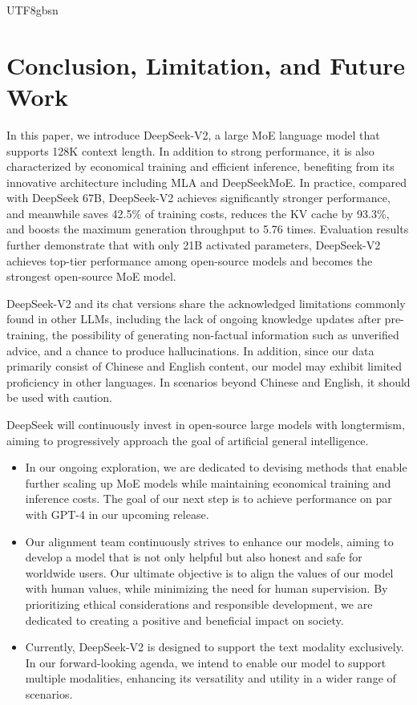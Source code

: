 \documentclass[11pt, a4paper, logo, copyright, nonumbering]{deepseek}
\newcommand{\dsvi}{DeepSeek 67B}
\newcommand{\dsvii}{DeepSeek-V2}
\newcommand{\dsattn}{MLA}
\newcommand{\dsmoe}{DeepSeekMoE}
\begin{document}
\begin{CJK*}{UTF8}{gbsn}
\section{Conclusion, Limitation, and Future Work}
\label{sec:conclusion}

In this paper, we introduce \dsvii{}, a large MoE language model that supports 128K context length. 
In addition to strong performance, it is also characterized by economical training and efficient inference, benefiting from its innovative architecture including \dsattn{} and \dsmoe{}. 
In practice, compared with \dsvi{}, \dsvii{} achieves significantly stronger
performance, and meanwhile saves 42.5\% of training costs, reduces the KV cache by 93.3\%, and boosts the maximum generation throughput to 5.76 times. 
Evaluation results further demonstrate that with only 21B activated parameters, \dsvii{} achieves top-tier performance among open-source models and becomes the strongest open-source MoE model. 

\dsvii{} and its chat versions share the acknowledged limitations commonly found in other LLMs, including the lack of ongoing knowledge updates after pre-training, the possibility of generating non-factual information such as unverified advice, and a chance to produce hallucinations. 
In addition, since our data primarily consist of Chinese and English content, our model may exhibit limited proficiency in other languages. 
In scenarios beyond Chinese and English, it should be used with caution.

DeepSeek will continuously invest in open-source large models with longtermism, aiming to progressively approach the goal of artificial general intelligence.
\begin{itemize}
    \item 
    In our ongoing exploration, we are dedicated to devising methods that enable further scaling up MoE models while maintaining economical training and inference costs. 
    The goal of our next step is to achieve performance on par with GPT-4 in our upcoming release.
    \item 
    Our alignment team continuously strives to enhance our models, aiming to develop a model that is not only helpful but also honest and safe for worldwide users. 
    Our ultimate objective is to align the values of our model with human values, while minimizing the need for human supervision. 
    By prioritizing ethical considerations and responsible development, we are dedicated to creating a positive and beneficial impact on society.  
    \item 
    Currently, \dsvii{} is designed to support the text modality exclusively. 
    In our forward-looking agenda, we intend to enable our model to support multiple modalities, enhancing its versatility and utility in a wider range of scenarios.
\end{itemize}


\end{CJK*}
\end{document}
